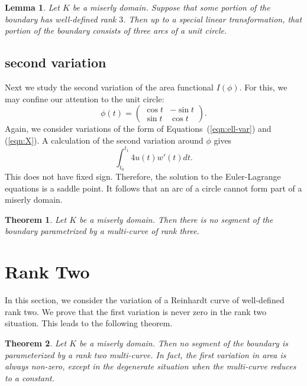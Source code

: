 \documentclass[11pt]{amsart}
\newtheorem{thm}{Theorem}
\newtheorem{lemma}{Lemma}
\begin{document}
\begin{lemma}  Let $K$ be a miserly domain.  Suppose that some portion of the boundary
has well-defined rank $3$.  Then up to a special linear transformation, that portion of the boundary
consists of three arcs of a unit circle.
\end{lemma}


\subsection{second variation}

Next we study the second variation of the area functional $I(\phi)$.  For this,
we may confine our attention to the unit circle:
$$
\phi(t) = \begin{pmatrix} \cos t & -\sin t \\ \sin t & \cos t
\end{pmatrix}.
$$
Again, we consider variations of the form of Equations~(\ref{eqn:ell-var}) and (\ref{eqn:X}).
A calculation of the second variation around $\phi$ gives
$$
\int_{t_0}^{t_1} 4 u(t) w'(t) dt.
$$
This does not have fixed sign.  Therefore, the solution to the Euler-Lagrange equations is a saddle point. 
It follows that an arc of a circle cannot form part of a miserly domain.

\begin{thm}  Let $K$ be a miserly domain.  Then there is no segment
of the boundary parametrized by a multi-curve of  rank  three.
\end{thm}



\section{Rank Two}


In this section, we consider the variation of a Reinhardt curve
of well-defined rank two. 
We prove that the first variation is never zero in the rank two situation.  This leads to the following theorem. 

\begin{thm}  Let $K$ be a miserly domain.  Then no segment of the boundary is parameterized by a rank two multi-curve.  In fact, the first variation in area is always non-zero, except in the degenerate situation when the multi-curve reduces to a constant.
\end{thm}
\end{document}
